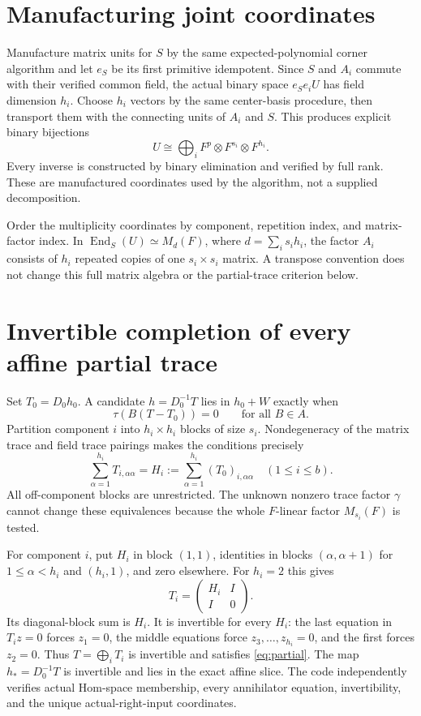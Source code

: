 \documentclass[11pt]{article}
\newcommand{\End}{\operatorname{End}}
\begin{document}
\section{Manufacturing joint coordinates}

Manufacture matrix units for $S$ by the same expected-polynomial corner
algorithm and let $e_S$ be its first primitive idempotent. Since $S$ and
$A_i$ commute with their verified common field, the actual binary space
$e_Se_iU$ has field dimension $h_i$. Choose $h_i$ vectors by the same
center-basis procedure, then transport them with the connecting units of
$A_i$ and $S$. This produces explicit binary bijections
\[
 U\cong\bigoplus_i F^p\otimes F^{s_i}\otimes F^{h_i}.
\]
Every inverse is constructed by binary elimination and verified by full
rank. These are manufactured coordinates used by the algorithm, not a
supplied decomposition.

Order the multiplicity coordinates by component, repetition index, and
matrix-factor index. In $\End_S(U)\simeq M_d(F)$, where
$d=\sum_i s_i h_i$, the factor $A_i$ consists of $h_i$ repeated copies of
one $s_i\times s_i$ matrix. A transpose convention does not change this
full matrix algebra or the partial-trace criterion below.

\section{Invertible completion of every affine partial trace}

Set $T_0=D_0h_0$. A candidate $h=D_0^{-1}T$ lies in $h_0+W$ exactly when
\[
 \tau(B(T-T_0))=0\qquad\text{for all }B\in A.
\]
Partition component $i$ into $h_i\times h_i$ blocks of size $s_i$.
Nondegeneracy of the matrix trace and field trace pairings makes the
conditions precisely
\begin{equation}\label{eq:partial}
 \sum_{\alpha=1}^{h_i}T_{i,\alpha\alpha}
 =H_i:=\sum_{\alpha=1}^{h_i}(T_0)_{i,\alpha\alpha}\quad(1\le i\le b).
\end{equation}
All off-component blocks are unrestricted. The unknown nonzero trace
factor $\gamma$ cannot change these equivalences because the whole
$F$-linear factor $M_{s_i}(F)$ is tested.

For component $i$, put $H_i$ in block $(1,1)$, identities in blocks
$(\alpha,\alpha+1)$ for $1\le\alpha<h_i$ and $(h_i,1)$, and zero elsewhere.
For $h_i=2$ this gives
\[
 T_i=\begin{pmatrix}H_i&I\\I&0\end{pmatrix}.
\]
Its diagonal-block sum is $H_i$. It is invertible for every $H_i$: the
last equation in $T_i z=0$ forces $z_1=0$, the middle equations force
$z_3,\ldots,z_{h_i}=0$, and the first forces $z_2=0$.
Thus $T=\bigoplus_iT_i$ is invertible and satisfies \eqref{eq:partial}.
The map $h_*=D_0^{-1}T$ is invertible and lies in the exact affine slice.
The code independently verifies actual Hom-space membership, every
annihilator equation, invertibility, and the unique actual-right-input
coordinates.
\end{document}
